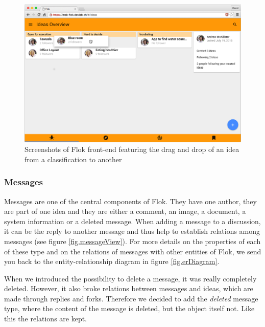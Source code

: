 \documentclass[a4paper,12pt, oneside]{article}
\begin{document}
\begin{figure}[!htb]
\centering
\includegraphics[width=\textwidth]{images/classificationDragAndDrop.png}
\caption{Screenshots of Flok front-end featuring the drag and drop of an idea from a classification to another}
\label{fig.classificationDragAndDrop}
\end{figure}

\FloatBarrier
\subsubsection{Messages}
\label{sec.messages}
Messages are one of the central components of Flok.
They have one author, they are part of one idea and they are either a comment, an image, a document, a system information or a deleted message.
When adding a message to a discussion, it can be the reply to another message and thus help to establish relations among messages (see figure \ref{fig.messageView}).
For more details on the properties of each of these type and on the relations of messages with other entities of Flok, we send you back to the entity-relationship diagram in figure \ref{fig.erDiagram}.

When we introduced the possibility to delete a message, it was really completely deleted.
However, it also broke relations between messages and ideas, which are made through replies and forks.
Therefore we decided to add the \emph{deleted} message type, where the content of the message is deleted, but the object itself not.
Like this the relations are kept.
\end{document}
